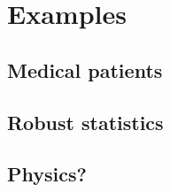 \documentclass[
  12pt]{article}
\begin{document}
\section{Examples}\label{sec-examples}

\subsection{Medical patients}\label{medical-patients}

\subsection{Robust statistics}\label{robust-statistics}

\subsection{Physics?}\label{physics}


\renewcommand\refname{Conclusion}
  
\end{document}

